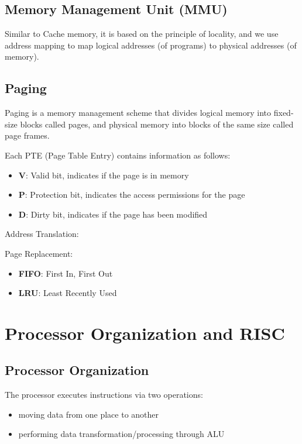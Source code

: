 \documentclass[11pt,a4paper]{article}
\begin{document}
\subsection{Memory Management Unit (MMU)}
Similar to Cache memory, it is based on the principle of locality, and we use address mapping to map logical addresses (of programs) to physical addresses (of memory). \par

\subsection{Paging}
Paging is a memory management scheme that divides logical memory into fixed-size blocks called pages, and physical memory into blocks of the same size called page frames. \par

Each PTE (Page Table Entry) contains information as follows:
\begin{itemize}
    \item \textbf{V}: Valid bit, indicates if the page is in memory
    \item \textbf{P}: Protection bit, indicates the access permissions for the page
    \item \textbf{D}: Dirty bit, indicates if the page has been modified
\end{itemize}

Address Translation:

Page Replacement:
\begin{itemize}
    \item \textbf{FIFO}: First In, First Out
    \item \textbf{LRU}: Least Recently Used
\end{itemize}

\section{Processor Organization and RISC}
\subsection{Processor Organization}
The processor executes instructions via two operations:
\begin{itemize}
    \item moving data from one place to another
    \item performing data transformation/processing through ALU
\end{itemize}
\end{document}
